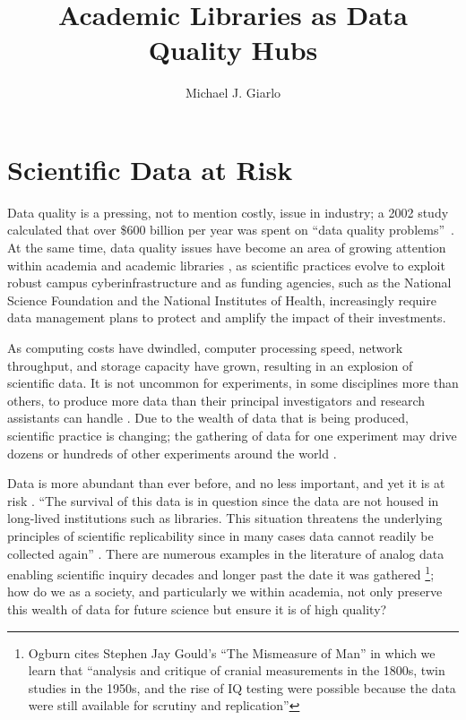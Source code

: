 \documentclass[man,12pt,biblatex]{apa6}
\title{Academic Libraries as Data Quality Hubs}
\author{Michael J. Giarlo}
\affiliation{Penn State University}
\begin{document}
\maketitle
\section{Scientific Data at Risk}
Data quality is a pressing, not to mention costly, issue in industry;
a 2002 study \parencite{russom:case} calculated that over \$600 billion per
year was spent on ``data quality problems''\ 
\parencite{eckerson:bottomline}.  At the same time, data quality issues
have become an area of growing attention within academia and academic
libraries \parencite{heidorn:libraries,arl:stewardship,ogburn:imperative,jisc:deluge},
as scientific practices evolve to exploit robust campus
cyberinfrastructure and as funding agencies, such as the National
Science Foundation and the National Institutes of Health, increasingly
require data management plans to protect and amplify the impact of
their investments.

As computing costs have dwindled, computer processing speed, network
throughput, and storage capacity have grown, resulting in an explosion
of scientific data.  It is not uncommon for experiments, in some
disciplines more than others, to produce more data than their
principal investigators and research assistants can
handle \parencite{adams:galaxyzoo}. Due to the wealth of data that is
being produced, scientific practice is changing; the gathering of data
for one experiment may drive dozens or hundreds of other experiments
around the world \parencite{jisc:deluge}.

Data is more abundant than ever before, and no less important, and yet
it is at risk \parencite{ogburn:imperative,heidorn:libraries}.  ``The
survival of this data is in question since the data are not housed in
long-lived institutions such as libraries. This situation threatens
the underlying principles of scientific replicability since in many
cases data cannot readily be collected again''
\parencite{heidorn:libraries}. There are numerous examples in the
literature of analog data enabling scientific inquiry decades and
longer past the date it was gathered \footnote{Ogburn
  \parencite{ogburn:imperative} cites Stephen Jay Gould's ``The Mismeasure
  of Man'' in which we learn that ``analysis and critique of cranial
  measurements in the 1800s, twin studies in the 1950s, and the rise
  of IQ testing were possible because the data were still available
  for scrutiny and replication''}; how do we as a society, and
particularly we within academia, not only preserve this wealth of data
for future science but ensure it is of high quality?
\end{document}
